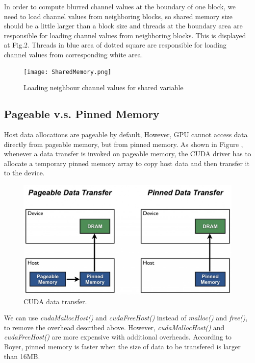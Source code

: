 \documentclass[journal,11pt,onecolumn,draftclsnofoot]{ieeeconf}  %
\begin{document}
In order to compute blurred channel values at the boundary of one block, we need to load channel values from neighboring blocks, so shared memory size should be a little larger than a block size and threads at the boundary area are responsible for loading channel values from neighboring blocks. This is displayed at Fig.2. Threads in blue area of dotted square are responsible for loading channel values from corresponding white area.

\begin{figure}[h]
	\centering\texttt{[image: SharedMemory.png]}
	\caption{Loading neighbour channel values for shared variable}
	\label{parallel}
\end{figure}

\subsection{Pageable v.s. Pinned Memory}
Host data allocations are pageable by default, However, GPU cannot access data directly from pageable memory, but from pinned memory. As shown in Figure \cite{Mark}, whenever a data transfer is invoked on pageable memory, the CUDA driver has to allocate a temporary pinned memory array to copy host data and then transfer it to the device. \par
\begin{figure}[h]
	\centering\includegraphics[width=120mm]{pinned.jpg}
	\caption{CUDA data transfer.\cite{Mark}}
	\label{CUDA data transfer.}
\end{figure}
We can use \textit{cudaMallocHost()} and \textit{cudaFreeHost()} instead of \textit{malloc()} and \textit{free()}, to remove the overhead described above. However, \textit{cudaMallocHost()} and \textit{cudaFreeHost()} are more expensive with additional overheads. According to Boyer\cite{Trade_off}, pinned memory is faster when the size of data to be transfered is larger than 16MB. \par
\end{document}
